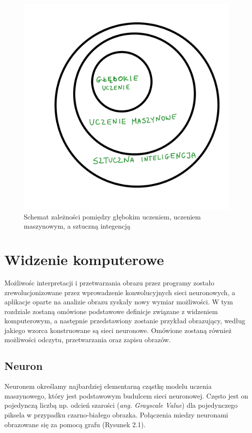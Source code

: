 \documentclass[openright]{xmgr}
\begin{document}
\begin{figure}[!tbh]
\centering
\includegraphics[width=.8\hsize]{fig/1}
\caption{Schemat zależności pomiędzy głębokim uczeniem, uczeniem maszynowym, a sztuczną integencją\label{RYS.1}}
\end{figure}

\chapter{Widzenie komputerowe  }

\indent \indent Możliwośc interpretacji i przetwarzania obrazu przez programy zostało zrewolucjonizowane przez wprowadzenie konwolucyjnych sieci neuronowych, a aplikacje oparte na analizie obrazu zyskały nowy wymiar możliwości. W tym rozdziale zostaną omówione podstawowe definicje związane z widzeniem komputerowym, a następnie przedstawiony zostanie przykład obrazujący, według jakiego wzorca konstruowane są sieci neuronowe. Omówione zostaną również 
możliwości odczytu, przetwarzania oraz zapisu obrazów.

\section{Neuron  \label{s:dsssl}}

\indent \indent Neuronem określamy najbardziej elementarną cząstkę modelu uczenia maszynowego, który jest podstawowym budulcem sieci neuronowej. Często jest on pojedynczą liczbą np. odcień szarości (\textit{ang. Grayscale Value}) dla pojedynczego piksela w przypadku czarno-białego obrazka. Połączenia miedzy neuronami obrazowane się za pomocą grafu (Rysunek 2.1).
\end{document}
